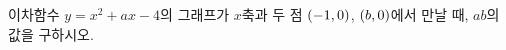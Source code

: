 이차함수 $y=x^2+ax-4$의 그래프가 $x$축과 두 점 $(-1{,}\mkern3mu\mathopen{}0)$, $(b{,}\mkern3mu\mathopen{}0)$에서 만날 때, $ab$의 값을 구하시오. 
